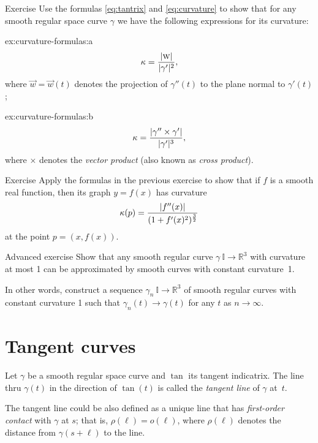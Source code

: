 \begin{thm}{Exercise}\label{ex:curvature-formulas}
Use the formulas \ref{eq:tantrix} and \ref{eq:curvature} to show that 
for any smooth regular space curve $\gamma$ we have the following expressions for its curvature:

\begin{subthm}{ex:curvature-formulas:a} 
\[\kappa=\frac{|\text{\sc{w}}|}{|\gamma'|^2},\]
where $\vec w=\vec w(t)$ denotes the projection of $\gamma''(t)$ to the plane normal to $\gamma'(t)$;
\end{subthm}

\begin{subthm}{ex:curvature-formulas:b}
\[\kappa=\frac{|\gamma''\times \gamma'|}{|\gamma'|^{3}},\]
where $\times$ denotes the \emph{vector product} (also known as \emph{cross product}).
\end{subthm}

\end{thm}


\begin{thm}{Exercise}\label{ex:curvature-graph}
Apply the formulas in the previous exercise to show that if $f$ is a smooth real function,
then its graph $y=f(x)$  has curvature
\[\kappa(p)=\frac{|f''(x)|}{(1+f'(x)^2)^{\frac32}}\]
at the point $p=(x,f(x))$.
\end{thm}

\begin{thm}{Advanced exercise}\label{ex:approximation-const-curvature}
Show that any smooth regular curve $\gamma\:\mathbb{I}\to\mathbb{R}^3$ with curvature at most 1 can be approximated by smooth curves with constant curvature~1.

In other words, construct a sequence $\gamma_n\:\mathbb{I}\to\mathbb{R}^3$ of smooth regular curves  with constant curvature 1 such that $\gamma_n(t)\to \gamma(t)$ for any $t$ as $n\to\infty$.
\end{thm}


\section{Tangent curves}

Let $\gamma$ be a smooth regular space curve and $\tan$ its tangent indicatrix.
The line thru $\gamma(t)$ in the direction of $\tan(t)$ is called the \emph{tangent line} of $\gamma$  at~$t$.

The tangent line could be also defined as a unique line that has \emph{first-order contact} with $\gamma$ at $s$;
that is, $\rho(\ell)=o(\ell)$, where $\rho(\ell)$ denotes the distance from $\gamma(s+\ell)$ to the line.

